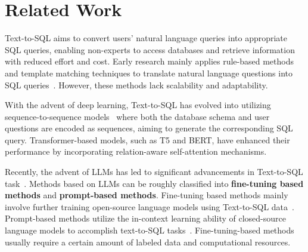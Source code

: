 \section{Related Work}
Text-to-SQL aims to convert users' natural language queries into appropriate SQL queries, enabling non-experts to access databases and retrieve information with reduced effort and cost. Early research mainly applies rule-based methods and template matching techniques to translate natural language questions into SQL queries~\citep{baik2020duoquest,stone2020athena++}. However, these methods lack scalability and adaptability.

 With the advent of deep learning, Text-to-SQL has evolved into utilizing sequence-to-sequence models~\citep{sutskever2014sequence} where both the database schema and user questions are encoded as sequences, aiming to generate the corresponding SQL query. Transformer-based models, such as T5 and BERT, have enhanced their performance by incorporating relation-aware self-attention mechanisms.

Recently, the advent of LLMs has led to significant advancements in Text-to-SQL task~\citep{rajkumar2022evaluating,ni2023lever,gao2024text}. 
Methods based on LLMs can be roughly classified into \textbf{fine-tuning based methods} and \textbf{prompt-based methods}.
Fine-tuning based methods mainly involve further training open-source language models using Text-to-SQL data~\citep{li2024codes,pourreza2024dts}. 
Prompt-based methods utilize the in-context learning ability of closed-source language models to accomplish text-to-SQL tasks~\citep{pourreza2024din,gao2024text,li2024dawn,qu2024before}.
Fine-tuning-based methods usually require a certain amount of labeled data and computational resources.

